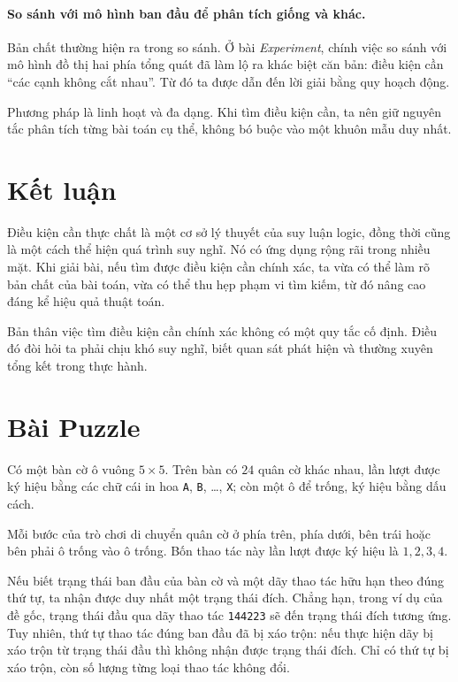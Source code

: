 \documentclass[11pt]{article}
\begin{document}
\paragraph{So sánh với mô hình ban đầu để phân tích giống và khác.}
Bản chất thường hiện ra trong so sánh. Ở bài \emph{Experiment}, chính việc so
sánh với mô hình đồ thị hai phía tổng quát đã làm lộ ra khác biệt căn bản:
điều kiện cần ``các cạnh không cắt nhau''. Từ đó ta được dẫn đến lời giải bằng
quy hoạch động.

Phương pháp là linh hoạt và đa dạng. Khi tìm điều kiện cần, ta nên giữ nguyên
tắc phân tích từng bài toán cụ thể, không bó buộc vào một khuôn mẫu duy nhất.

\section{Kết luận}

Điều kiện cần thực chất là một cơ sở lý thuyết của suy luận logic, đồng thời
cũng là một cách thể hiện quá trình suy nghĩ. Nó có ứng dụng rộng rãi trong
nhiều mặt. Khi giải bài, nếu tìm được điều kiện cần chính xác, ta vừa có thể
làm rõ bản chất của bài toán, vừa có thể thu hẹp phạm vi tìm kiếm, từ đó nâng
cao đáng kể hiệu quả thuật toán.

Bản thân việc tìm điều kiện cần chính xác không có một quy tắc cố định. Điều
đó đòi hỏi ta phải chịu khó suy nghĩ, biết quan sát phát hiện và thường xuyên
tổng kết trong thực hành.

\appendix
\section{Bài Puzzle}

Có một bàn cờ ô vuông $5\times 5$. Trên bàn có $24$ quân cờ khác nhau, lần
lượt được ký hiệu bằng các chữ cái in hoa \texttt{A}, \texttt{B}, \ldots,
\texttt{X}; còn một ô để trống, ký hiệu bằng dấu cách.

Mỗi bước của trò chơi di chuyển quân cờ ở phía trên, phía dưới, bên trái hoặc
bên phải ô trống vào ô trống. Bốn thao tác này lần lượt được ký hiệu là
$1,2,3,4$.

Nếu biết trạng thái ban đầu của bàn cờ và một dãy thao tác hữu hạn theo đúng
thứ tự, ta nhận được duy nhất một trạng thái đích. Chẳng hạn, trong ví dụ của
đề gốc, trạng thái đầu qua dãy thao tác \texttt{144223} sẽ đến trạng thái
đích tương ứng. Tuy nhiên, thứ tự thao tác đúng ban đầu đã bị xáo trộn: nếu
thực hiện dãy bị xáo trộn từ trạng thái đầu thì không nhận được trạng thái
đích. Chỉ có thứ tự bị xáo trộn, còn số lượng từng loại thao tác không đổi.
\end{document}
